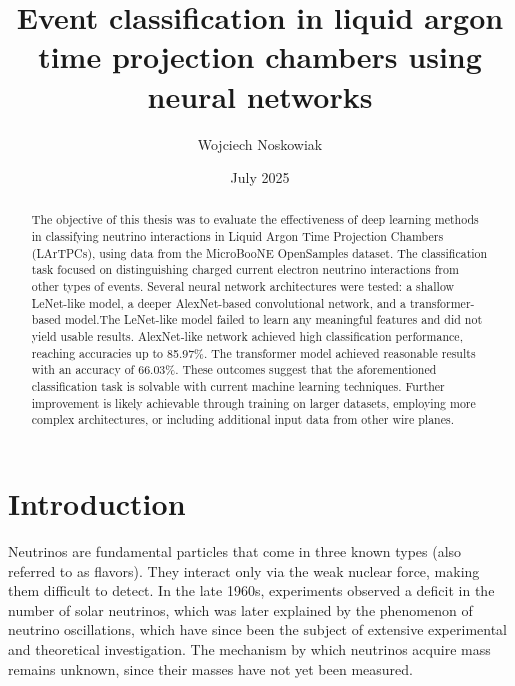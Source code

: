 \documentclass{pracalicmgr}
\author{Wojciech Noskowiak}
\title{Event classification in liquid argon time projection chambers using neural networks}
\date{July 2025}
\begin{document}
\setlength{\textheight}{24.5cm}
\setlength{\textwidth}{16cm}
\setlength{\topmargin}{-0.5cm}
\setlength{\headheight}{0cm}
\setlength{\oddsidemargin}{0.5cm}
\setlength{\evensidemargin}{-0.5cm}

\maketitle
\let\cleardoublepage\clearpage

\begin{abstract}
The objective of this thesis was to evaluate the effectiveness of deep learning methods in classifying neutrino interactions in Liquid Argon Time Projection Chambers (LArTPCs), using data from the MicroBooNE OpenSamples dataset. The classification task focused on distinguishing charged current electron neutrino interactions from other types of events. Several neural network architectures were tested: a shallow LeNet-like model, a deeper AlexNet-based convolutional network, and a transformer-based model.The LeNet-like model failed to learn any meaningful features and did not yield usable results. AlexNet-like network achieved high classification performance, reaching accuracies up to 85.97\%. The transformer model achieved reasonable results with an accuracy of 66.03\%. These outcomes suggest that the aforementioned classification task is solvable with current machine learning techniques. Further improvement is likely achievable through training on larger datasets, employing more complex architectures, or including additional input data from other wire planes.

\end{abstract}

\tableofcontents

\chapter*{Introduction}

Neutrinos are fundamental particles that come in three known types (also referred to as flavors). They interact only via the weak nuclear force, making them difficult to detect. In the late 1960s, experiments observed a deficit in the number of solar neutrinos, which was later explained by the phenomenon of neutrino oscillations, which have since been the subject of extensive experimental and theoretical investigation\cite{NeutrionoOscillationsHistory}. The mechanism by which neutrinos acquire mass remains unknown, since their masses have not yet been measured.
\end{document}
